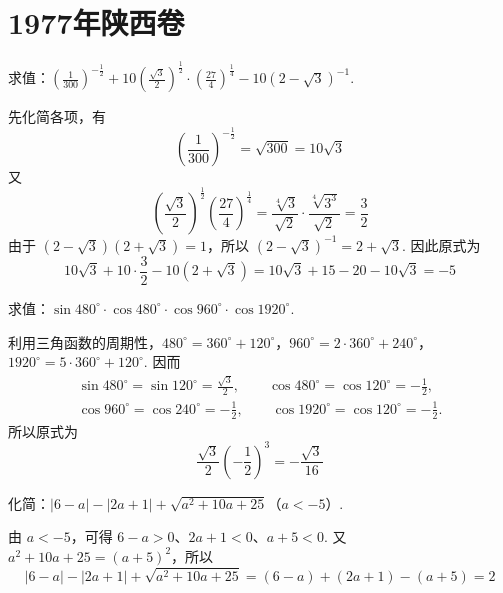 \chapter{1977年陕西卷}

\begin{problem}
求值：\( \left( \frac{1}{300} \right)^{-\frac{1}{2}}+10\left( \frac{\sqrt{3}}{2} \right)^{\frac{1}{2}}\cdot\left( \frac{27}{4} \right)^{\frac{1}{4}}-10\left( 2-\sqrt{3} \right)^{-1} \).
\end{problem}

\begin{solution}
先化简各项，有
\[
\left( \frac{1}{300} \right)^{-\frac{1}{2}}=\sqrt{300}=10\sqrt{3}
\]
又
\[
\left( \frac{\sqrt{3}}{2} \right)^{\frac{1}{2}}\left( \frac{27}{4} \right)^{\frac{1}{4}}=\frac{\sqrt[4]{3}}{\sqrt{2}}\cdot\frac{\sqrt[4]{3^3}}{\sqrt{2}}=\frac{3}{2}
\]
由于 \(\left(2-\sqrt{3}\right)\left(2+\sqrt{3}\right)=1\)，所以 \(\left(2-\sqrt{3}\right)^{-1}=2+\sqrt{3}\). 因此原式为
\[
10\sqrt{3}+10\cdot\frac{3}{2}-10\left(2+\sqrt{3}\right)=10\sqrt{3}+15-20-10\sqrt{3}=-5
\]
\end{solution}

\begin{problem}
求值：\( \sin 480^\circ\cdot\cos 480^\circ\cdot\cos 960^\circ\cdot\cos 1920^\circ \).
\end{problem}

\begin{solution}
利用三角函数的周期性，\(480^\circ=360^\circ+120^\circ\)，\(960^\circ=2\cdot360^\circ+240^\circ\)，\(1920^\circ=5\cdot360^\circ+120^\circ\). 因而
\[
\begin{gathered}
\sin480^\circ=\sin120^\circ=\frac{\sqrt{3}}{2},\qquad \cos480^\circ=\cos120^\circ=-\frac{1}{2},\\
\cos960^\circ=\cos240^\circ=-\frac{1}{2},\qquad \cos1920^\circ=\cos120^\circ=-\frac{1}{2}.
\end{gathered}
\]
所以原式为
\[
\frac{\sqrt{3}}{2}\left(-\frac{1}{2}\right)^3=-\frac{\sqrt{3}}{16}
\]
\end{solution}

\begin{problem}
化简：\( \left| 6-a \right|-\left| 2a+1 \right|+\sqrt{a^2+10a+25} \)（\( a<-5 \)）.
\end{problem}

\begin{solution}
由 \(a<-5\)，可得 \(6-a>0\)、\(2a+1<0\)、\(a+5<0\). 又
\(a^2+10a+25=(a+5)^2\)，所以
\[
\left|6-a\right|-\left|2a+1\right|+\sqrt{a^2+10a+25}=(6-a)+(2a+1)-\left(a+5\right)=2
\]
\end{solution}

